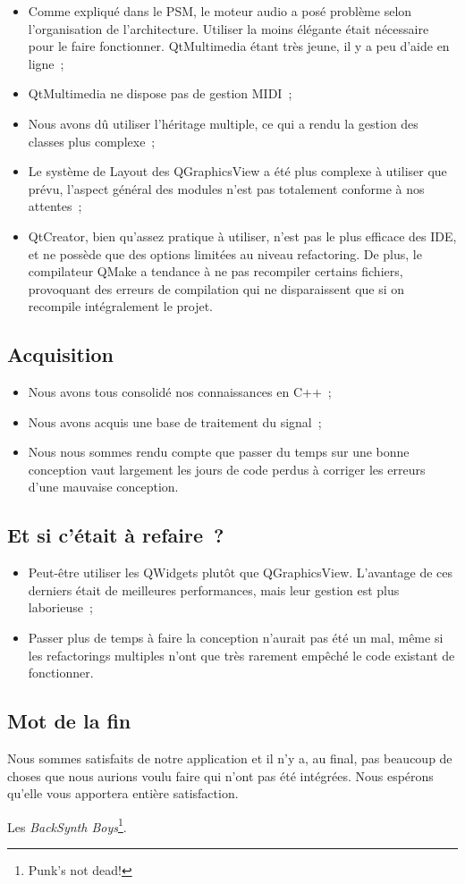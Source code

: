 \begin{itemize}
\item
  Comme expliqué dans le PSM, le moteur audio a posé problème selon
  l'organisation de l'architecture. Utiliser la moins élégante était
  nécessaire pour le faire fonctionner. QtMultimedia étant très
  jeune, il y a peu d'aide en ligne~;
\item
  QtMultimedia ne dispose pas de gestion MIDI~;
\item
  Nous avons dû utiliser l'héritage multiple, ce qui a rendu la
  gestion des classes plus complexe~;
\item
  Le système de Layout des QGraphicsView a été plus complexe à
  utiliser que prévu, l'aspect général des modules n'est pas
  totalement conforme à nos attentes~;
\item
  QtCreator, bien qu'assez pratique à utiliser, n'est pas le plus
  efficace des IDE, et ne possède que des options limitées au niveau
  refactoring. De plus, le compilateur QMake a tendance à ne pas
  recompiler certains fichiers, provoquant des erreurs de compilation
  qui ne disparaissent que si on recompile intégralement le projet.
\end{itemize}

\subsection{Acquisition}

\begin{itemize}
\item
  Nous avons tous consolidé nos connaissances en C++~;
\item
  Nous avons acquis une base de traitement du signal~;
\item
  Nous nous sommes rendu compte que passer du temps sur une bonne
  conception vaut largement les jours de code perdus à corriger les
  erreurs d'une mauvaise conception.
\end{itemize}

\subsection{Et si c'était à refaire~?}

\begin{itemize}
\item
  Peut-être utiliser les QWidgets plutôt que QGraphicsView.
  L'avantage de ces derniers était de meilleures performances, mais
  leur gestion est plus laborieuse~;
\item
  Passer plus de temps à faire la conception n'aurait pas été un mal,
  même si les refactorings multiples n'ont que très rarement empêché
  le code existant de fonctionner.
\end{itemize}

\subsection{Mot de la fin}

Nous sommes satisfaits de notre application et il n'y a, au final,
pas beaucoup de choses que nous aurions voulu faire qui n'ont pas
été intégrées. Nous espérons qu'elle vous apportera entière
satisfaction.

Les \emph{BackSynth Boys}\footnote{Punk's not dead!}.

